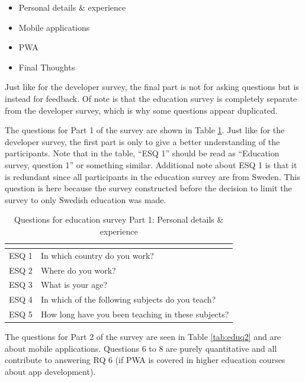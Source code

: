 \documentclass[a4paper,12pt]{article}
\begin{document}
\begin{itemize}
    \item Personal details \& experience
    \item Mobile applications
    \item PWA
    \item Final Thoughts
\end{itemize}

Just like for the developer survey, the final part is not for asking questions but is instead for feedback. Of note is that the education survey is completely separate from the developer survey, which is why some questions appear duplicated.

The questions for Part 1 of the survey are shown in Table \ref{tab:eduq1}. Just like for the developer survey, the first part is only to give a better understanding of the participants. Note that in the table, “ESQ 1” should be read as “Education survey, question 1” or something similar. Additional note about ESQ 1 is that it is redundant since all participants in the education survey are from Sweden. This question is here because the survey constructed before the decision to limit the survey to only Swedish education was made.

\begin{table}[ht]
\centering
{}
\begin{tabular}{|l|l|}
\hline
\rowcolor[HTML]{656565}
\multicolumn{1}{|c|}{\cellcolor[HTML]{656565}{\color[HTML]{FFFFFF} Number}} & \multicolumn{1}{l|}{\cellcolor[HTML]{656565}{\color[HTML]{FFFFFF} Question}} \\ \hline
ESQ 1 & In which country do you work? \\
ESQ 2 & Where do you work? \\
ESQ 3 & What is your age? \\
ESQ 4 & In which of the following subjects do you teach? \\
ESQ 5 & How long have you been teaching in these subjects? \\
\hline
\end{tabular}
\caption{Questions for education survey Part 1: Personal details \& experience}
\label{tab:eduq1}
\end{table}

The questions for Part 2 of the survey are seen in Table \ref{tab:eduq2} and are about mobile applications. Questions 6 to 8 are purely quantitative and all contribute to answering RQ 6 (if PWA is covered in higher education courses about app development).
\end{document}
